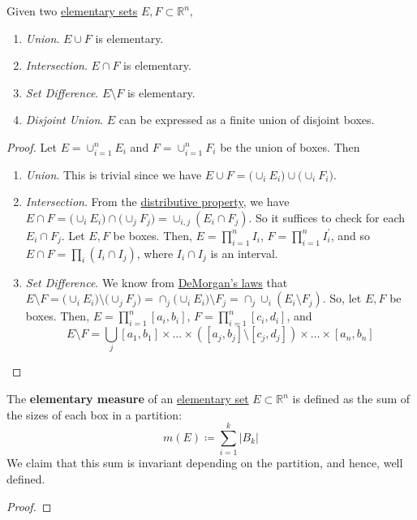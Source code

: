  \begin{lemma}
		\label{thm:set_prop_elementary_sets}
    Given two \hyperref[def:elementary-set]{elementary sets} $E, F \subset \mathbb{R}^n$, 
    \begin{enumerate}
      \item \textit{Union}. $E \cup F$ is elementary. 
      \item \textit{Intersection}. $E \cap F$ is elementary. 
      \item \textit{Set Difference}. $E \setminus F$ is elementary. 
			\item \textit{Disjoint Union}. $E$ can be expressed as a finite union of disjoint boxes. 
    \end{enumerate}
  \end{lemma}
  \begin{proof}
		Let $E = \cup_{i=1}^n E_i$ and $F = \cup_{i=1}^n F_i$ be the union of boxes. Then
		\begin{enumerate}
		  \item \textit{Union}. This is trivial since we have $E \cup F = \big( \cup_i E_i \big) \cup \big( \cup_i F_i \big)$.

			\item \textit{Intersection}. From the \hyperref[st-thm:distributive]{distributive property}, we have $E \cap F = \big( \cup_i E_i \big) \cap \big( \cup_j F_j \big) = \cup_{i, j} (E_i \cap F_j)$. So it suffices to check for each $E_i \cap F_j$. Let $E, F$ be boxes. Then, $E = \prod_{i=1}^n I_i$, $F = \prod_{i=1}^n I^\prime_i$, and so $E \cap F = \prod_i (I_i \cap I_j)$, where $I_i \cap I_j$ is an interval. 

			\item \textit{Set Difference}. We know from \hyperref[st-thm:demorgan]{DeMorgan's laws} that $E \setminus F = \big( \cup_i E_i \big) \setminus \big( \cup_j F_j \big) = \cap_j \big( \cup_i E_i \big) \setminus F_j = \cap_j \cup_i (E_i \setminus F_j)$. So, let $E, F$ be boxes. Then, $E = \prod_{i=1}^n [a_i, b_i] $, $F = \prod_{i=1}^n [c_i, d_i]$, and 
				\begin{equation}
					E \setminus F = \bigcup_j [a_1, b_1] \times \ldots \times ([a_j, b_j] \setminus [c_j, d_j]) \times \ldots \times [a_n, b_n]
				\end{equation}
		\end{enumerate}
  \end{proof}

  \begin{definition}
    \label{def:elementary-measure}
    The \textbf{elementary measure} of an \hyperref[def:elementary-set]{elementary set} $E \subset \mathbb{R}^n$ is defined as the sum of the sizes of each box in a partition: 
    \begin{equation}
      m(E) \coloneqq \sum_{i=1}^k |B_k|
    \end{equation}
    We claim that this sum is invariant depending on the partition, and hence, well defined. 
  \end{definition}
  \begin{proof}
    
  \end{proof}

